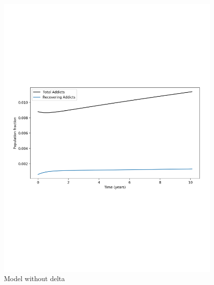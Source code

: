 \documentclass[12pt]{article}
\begin{document}
\begin{figure}[!htb]
\begin{minipage}{.6\textwidth}
\includegraphics[width=.91\linewidth, height=0.266\textheight]{plot_remove_delta_total}
\caption{Model without delta}
\end{minipage}
\end{figure}






\pagebreak
\end{document}
